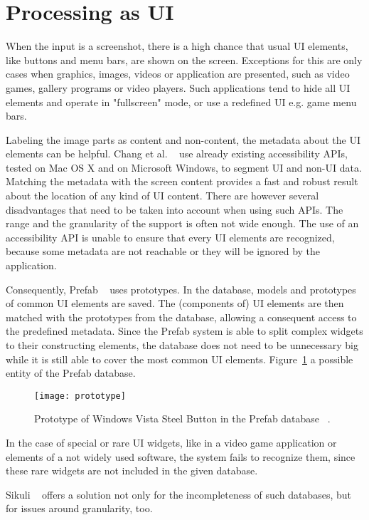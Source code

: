 \documentclass[draft,final]{vutinfth} %
\begin{document}
	\section{Processing as UI}
	When the input is a screenshot, there is a high chance that usual UI elements, like buttons and menu bars, are shown on the screen.
	Exceptions for this are only cases when graphics, images, videos or application are presented, such as video games, gallery programs or video players.
	Such applications tend to hide all UI elements and operate in "fullscreen" mode, or use a redefined UI e.g. game menu bars.\par
	Labeling the image parts as content and non-content, the metadata about the UI elements can be helpful.
	Chang et al. ~\cite{chang2011associating} use already existing accessibility APIs, tested on Mac OS X and on Microsoft Windows, to segment UI and non-UI data. 
	Matching the metadata with the screen content provides a fast and robust result about the location of any kind of UI content.
	There are however several disadvantages that need to be taken into account when using such APIs.
	The range and the granularity of the support is often not wide enough.
	The use of an accessibility API is unable to ensure that every UI elements are recognized, because some metadata are not reachable or they will be ignored by the application.\par
	Consequently, Prefab ~\cite{dixon2010prefab} uses prototypes. 
	In the database, models and  prototypes of common UI elements are saved.
	The (components of) UI elements are then matched with the prototypes from the database, allowing a consequent access to the predefined metadata.
	Since the Prefab system is able to split complex widgets to their constructing elements, the database does not need to be unnecessary big while it is still able to cover the most common UI elements.
	Figure~\ref{fig:prototype} a possible entity of the Prefab database.
	\begin{figure}[H]
		\centering		
		\texttt{[image: prototype]}
		\caption{Prototype of Windows Vista Steel Button in the Prefab database ~\cite{dixon2010prefab}.}
		\label{fig:prototype}
	\end{figure} 
	In the case of special or rare UI widgets, like in a video game application or elements of a not widely used software, the system fails to recognize them, since these rare widgets are not included in the given database.\par
	Sikuli ~\cite{yeh2009sikuli} offers a solution not only for the incompleteness of such databases, but for issues around granularity, too.
\end{document}
